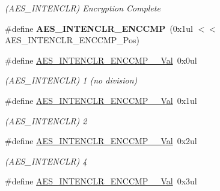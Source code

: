\begin{DoxyCompactItemize}
\begin{DoxyCompactList}\small\item\em (A\+E\+S\+\_\+\+I\+N\+T\+E\+N\+C\+L\+R) Encryption Complete \end{DoxyCompactList}\item 
\hypertarget{group___s_a_m_l21___a_e_s_ga7e6d870ee04c7d8b7441b78691892d7f}{}\#define {\bfseries A\+E\+S\+\_\+\+I\+N\+T\+E\+N\+C\+L\+R\+\_\+\+E\+N\+C\+C\+M\+P}~(0x1ul $<$$<$ A\+E\+S\+\_\+\+I\+N\+T\+E\+N\+C\+L\+R\+\_\+\+E\+N\+C\+C\+M\+P\+\_\+\+Pos)\label{group___s_a_m_l21___a_e_s_ga7e6d870ee04c7d8b7441b78691892d7f}

\item 
\hypertarget{group___s_a_m_l21___a_e_s_gaeec3d301f2c09f00485fc77411ce7176}{}\#define \hyperlink{group___s_a_m_l21___a_e_s_gaeec3d301f2c09f00485fc77411ce7176}{A\+E\+S\+\_\+\+I\+N\+T\+E\+N\+C\+L\+R\+\_\+\+E\+N\+C\+C\+M\+P\+\_\+\_\+\+Val}~0x0ul\label{group___s_a_m_l21___a_e_s_gaeec3d301f2c09f00485fc77411ce7176}

\begin{DoxyCompactList}\small\item\em (A\+E\+S\+\_\+\+I\+N\+T\+E\+N\+C\+L\+R) 1 (no division) \end{DoxyCompactList}\item 
\hypertarget{group___s_a_m_l21___a_e_s_ga2c8ac03e955ae2091868637521b98649}{}\#define \hyperlink{group___s_a_m_l21___a_e_s_ga2c8ac03e955ae2091868637521b98649}{A\+E\+S\+\_\+\+I\+N\+T\+E\+N\+C\+L\+R\+\_\+\+E\+N\+C\+C\+M\+P\+\_\+\_\+\+Val}~0x1ul\label{group___s_a_m_l21___a_e_s_ga2c8ac03e955ae2091868637521b98649}

\begin{DoxyCompactList}\small\item\em (A\+E\+S\+\_\+\+I\+N\+T\+E\+N\+C\+L\+R) 2 \end{DoxyCompactList}\item 
\hypertarget{group___s_a_m_l21___a_e_s_ga7b2cd1e4bd933d52807a858da1dacd29}{}\#define \hyperlink{group___s_a_m_l21___a_e_s_ga7b2cd1e4bd933d52807a858da1dacd29}{A\+E\+S\+\_\+\+I\+N\+T\+E\+N\+C\+L\+R\+\_\+\+E\+N\+C\+C\+M\+P\+\_\+\_\+\+Val}~0x2ul\label{group___s_a_m_l21___a_e_s_ga7b2cd1e4bd933d52807a858da1dacd29}

\begin{DoxyCompactList}\small\item\em (A\+E\+S\+\_\+\+I\+N\+T\+E\+N\+C\+L\+R) 4 \end{DoxyCompactList}\item 
\hypertarget{group___s_a_m_l21___a_e_s_gad41f91b862c2e6e70e7ebd4c8fc6ac40}{}\#define \hyperlink{group___s_a_m_l21___a_e_s_gad41f91b862c2e6e70e7ebd4c8fc6ac40}{A\+E\+S\+\_\+\+I\+N\+T\+E\+N\+C\+L\+R\+\_\+\+E\+N\+C\+C\+M\+P\+\_\+\_\+\+Val}~0x3ul\label{group___s_a_m_l21___a_e_s_gad41f91b862c2e6e70e7ebd4c8fc6ac40}


\end{DoxyCompactItemize}
